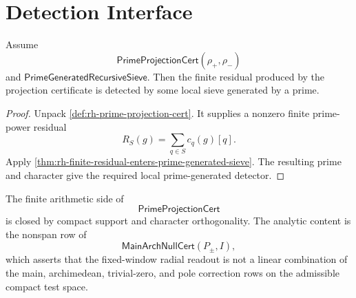 \section{Detection Interface}
\label{sec:rh-prime-projection-detection-interface}

\begin{theorem}
\label{thm:rh-prime-projection-cert-supplies-prime-generated-detector}
Assume
$$
\mathsf{PrimeProjectionCert}(\rho_+,\rho_-)
$$
and $\mathsf{PrimeGeneratedRecursiveSieve}$.  Then the finite residual
produced by the projection certificate is detected by some local sieve
generated by a prime.
\end{theorem}

\begin{proof}
Unpack \autoref{def:rh-prime-projection-cert}.  It supplies a nonzero
finite prime-power residual
$$
R_S(g)=\sum_{q\in S}c_q(g)[q].
$$
Apply
\autoref{thm:rh-finite-residual-enters-prime-generated-sieve}.  The
resulting prime and character give the required local
prime-generated detector.
\end{proof}

\begin{principle}
\label{prin:rh-prime-projection-audit-boundary}
The finite arithmetic side of
$$
\mathsf{PrimeProjectionCert}
$$
is closed by compact support and character orthogonality.  The analytic
content is the nonspan row of
$$
\mathsf{MainArchNullCert}(P_\pm,I),
$$
which asserts that the fixed-window radial readout is not a linear
combination of the main, archimedean, trivial-zero, and pole correction
rows on the admissible compact test space.
\end{principle}

